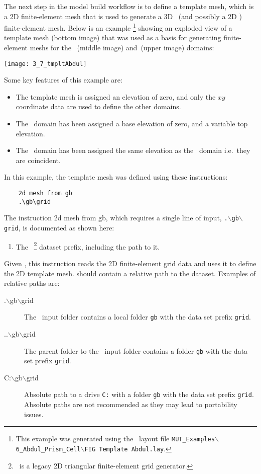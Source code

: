 \label{texfile:TemplateMesh}
The next step in the model build workflow is to define a template mesh, which is a 2D finite-element mesh that is used to generate a 3D \gwf\ (and possibly a 2D \swf) finite-element mesh.   Below is an example
\footnote{This example was generated using the \tecplot\ layout file \texttt{MUT\_Examples$\backslash$6\_Abdul\_Prism\_Cell$\backslash$FIG Template Abdul.lay}. }
  showing an exploded view of a template mesh (bottom image) that was used as a basis for generating  finite-element meshs for the \gwf\ (middle image) and\swf\ (upper image) domains:

    \texttt{[image: 3\_7\_tmpltAbdul]}

Some key features of this example are:
\begin{itemize}
  \item The template mesh is assigned an elevation of zero, and only the $xy$ coordinate data are used to define the other domains.
  \item The \gwf\ domain has been assigned a base elevation of zero, and a variable top elevation.
  \item The \swf\ domain has been assigned the same elevation as the \gwf\ domain i.e.\ they are coincident.
\end{itemize}

\pagebreak
 In this example, the template mesh was defined using these instructions:
 \squish
\begin{verbatim}
    2d mesh from gb
    .\gb\grid
\end{verbatim}
The instruction \textsf{2d mesh from gb}, which requires a single line of input, \texttt{.$\backslash$gb$\backslash$grid}, is documented as shown here:

    {
        \squish
        \begin{enumerate}
        \item {}  The \gb\ \footnote{\gb\ is a legacy 2D triangular finite-element grid generator.} dataset prefix, including the path to it.
        \end{enumerate}
        Given , this instruction reads the 2D finite-element grid data and uses it to define the 2D template mesh.   should contain a relative path to the dataset.  Examples of relative paths are:
        \begin{description}
        \item[.$\backslash$gb$\backslash$grid] The \mut\ input folder contains a local folder \texttt{gb} with the data set prefix \texttt{grid}.
        \item[..$\backslash$gb$\backslash$grid] The parent folder to the \mut\ input folder contains a folder \texttt{gb} with the data set prefix \texttt{grid}.
        \item[C:$\backslash$gb$\backslash$grid] Absolute path to a drive \texttt{C:} with a folder \texttt{gb} with the data set prefix \texttt{grid}.  Absolute paths are not recommended as they may lead to portability issues.
        \end{description}
        \squish
    }


